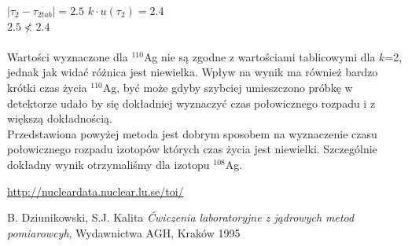 \documentclass{article}
\begin{document}
\noindent
$|\tau _2 -\tau _{2tab}| = 2.5$  $k\cdot u(\tau _2)=  2.4$ \\
$2.5 \not< 2.4$\\\\
Wartości wyznaczone dla $^{110}$Ag nie są zgodne z wartościami tablicowymi dla $k$=2, jednak jak widać różnica jest niewielka. Wpływ na wynik ma również bardzo krótki czas życia $^{110}$Ag, być może gdyby szybciej umieszczono próbkę w detektorze udało by się dokładniej wyznaczyć czas połowicznego rozpadu i z większą dokładnością.  \\
Przedstawiona powyżej metoda jest dobrym sposobem na wyznaczenie czasu połowicznego rozpadu izotopów których czas życia jest niewielki. Szczególnie dokładny wynik otrzymaliśmy dla izotopu $^{108}$Ag.







\begin{thebibliography}{9}
	
	
	\url{http://nucleardata.nuclear.lu.se/toi/}

	
	B. Dziunikowski, S.J. Kalita
	\emph{Ćwiczenia laboratoryjne z jądrowych metod pomiarowcyh}, Wydawnictwa AGH, Kraków 1995
	
\end{thebibliography}
\vspace{2cm}
\end{document}
